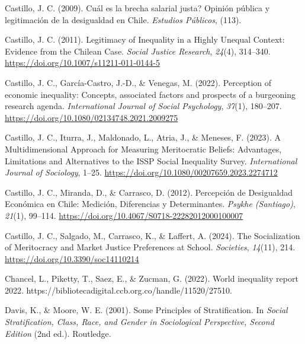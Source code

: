 \documentclass[
  12pt,
]{article}
\newlength{\cslhangindent}
\newenvironment{CSLReferences}[2] %
 {\begin{list}{}{%
  \setlength{\itemindent}{0pt}
  \setlength{\leftmargin}{0pt}
  \setlength{\parsep}{0pt}
  \ifodd #1
   \setlength{\leftmargin}{\cslhangindent}
   \setlength{\itemindent}{-1\cslhangindent}
  \fi
  \setlength{\itemsep}{#2\baselineskip}}}
 {\end{list}}
\begin{document}
\begin{CSLReferences}{1}{0}
Castillo, J. C. (2009). {{\textquestiondown}Cu{á}l es la brecha salarial
justa? Opini{ó}n p{ú}blica y legitimaci{ó}n de la desigualdad en Chile}.
\emph{Estudios P{ú}blicos}, (113).

Castillo, J. C. (2011). Legitimacy of {Inequality} in a {Highly Unequal
Context}: {Evidence} from the {Chilean Case}. \emph{Social Justice
Research}, \emph{24}(4), 314--340.
\url{https://doi.org/10.1007/s11211-011-0144-5}

Castillo, J. C., García-Castro, J.-D., \& Venegas, M. (2022). Perception
of economic inequality: Concepts, associated factors and prospects of a
burgeoning research agenda. \emph{International Journal of Social
Psychology}, \emph{37}(1), 180--207.
\url{https://doi.org/10.1080/02134748.2021.2009275}

Castillo, J. C., Iturra, J., Maldonado, L., Atria, J., \& Meneses, F.
(2023). A {Multidimensional Approach} for {Measuring Meritocratic
Beliefs}: {Advantages}, {Limitations} and {Alternatives} to the {ISSP
Social Inequality Survey}. \emph{International Journal of Sociology},
1--25. \url{https://doi.org/10.1080/00207659.2023.2274712}

Castillo, J. C., Miranda, D., \& Carrasco, D. (2012). Percepci{ó}n de
{Desigualdad Econ{ó}mica} en {Chile}: {Medici{ó}n}, {Diferencias} y
{Determinantes}. \emph{Psykhe (Santiago)}, \emph{21}(1), 99--114.
\url{https://doi.org/10.4067/S0718-22282012000100007}

Castillo, J. C., Salgado, M., Carrasco, K., \& Laffert, A. (2024). The
{Socialization} of {Meritocracy} and {Market Justice Preferences} at
{School}. \emph{Societies}, \emph{14}(11), 214.
\url{https://doi.org/10.3390/soc14110214}

Chancel, L., Piketty, T., Saez, E., \& Zucman, G. (2022). World
inequality report 2022.
https://bibliotecadigital.ccb.org.co/handle/11520/27510.

Davis, K., \& Moore, W. E. (2001). Some {Principles} of
{Stratification}. In \emph{Social {Stratification}, {Class}, {Race}, and
{Gender} in {Sociological Perspective}, {Second Edition}} (2nd ed.).
Routledge.


\end{CSLReferences}
\end{document}
